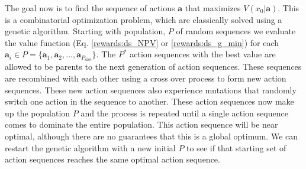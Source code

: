 \documentclass[12pt, a4paper]{article}
\begin{document}
The goal now is to find the sequence of actions $\mathbf{a}$ that maximizes $V(x_0|\mathbf{a})$. This is a combinatorial optimization problem, which are classically solved using a genetic algorithm. Starting with population, $P$ of random sequences we evaluate the value function (Eq. \ref{rewards:ds_NPV} or \ref{rewards:ds_g_min}) for each $\mathbf{a}_i \in P = \{\mathbf{a}_1, \mathbf{a}_2, ..., \mathbf{a}_{P_\text{size}}\}$. The $P^*$ action sequences with the best value are allowed to be parents to the next generation of action sequences. These sequences are recombined with each other using a cross over process to form new action sequences. These new action sequences also experience mutations that randomly switch one action in the sequence to another. These action sequences now make up the population $P$ and the process is repeated until a single action sequence comes to dominate the entire population. This action sequence will be near optimal, although there are no guarantees that this is a global optimum. We can restart the genetic algorithm with a new initial $P$ to see if that starting set of action sequences reaches the same optimal action sequence. 
\end{document}
